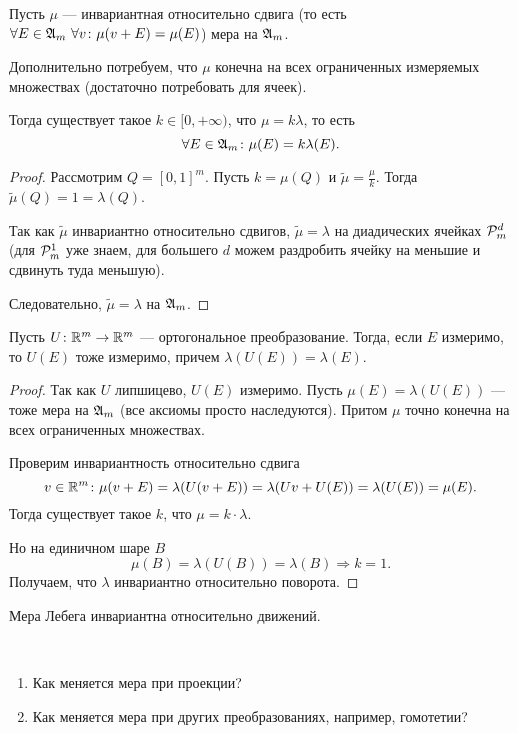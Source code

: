 \begin{thm}
	Пусть $ \mu$ --- инвариантная относительно сдвига (то есть $ \forall E \in \A_{m} ~ \forall v \colon \mu(v + E) = \mu(E)$) мера на  $ \A_{m}$.

	Дополнительно потребуем, что $ \mu$ конечна на всех ограниченных измеряемых множествах (достаточно потребовать для ячеек).

	Тогда существует такое $ k \in [0, +\infty)$, что $ \mu = k \lambda $, то есть 
	\[
		\forall E \in \A_m \colon \mu(E) = k \lambda (E)
	.\] 
\end{thm}
\begin{proof}
	Рассмотрим $ Q = [0, 1]^{m}$. Пусть $ k = \mu(Q)$ и $ \widetilde{ \mu} = \frac{\mu}{k}$.
	Тогда $ \widetilde{ \mu} (Q) = 1 = \lambda (Q)$. 

	Так как $ \widetilde{ \mu} $ инвариантно относительно сдвигов, $ \widetilde{ \mu}  = \lambda $ на диадических ячейках $ \P_{m}^{d}$ (для $ \P_{m}^{1}$ уже знаем, для большего $ d$ можем раздробить ячейку на меньшие и сдвинуть туда меньшую).

	Следовательно, $ \widetilde{ \mu}  = \lambda $ на $ \A_m$.
\end{proof}

\begin{thm}
	Пусть $ U\colon \R^{m} \to \R^{m} $ --- ортогональное преобразование. 
	Тогда, если $ E$ измеримо, то $ U(E)$ тоже измеримо, причем $ \lambda (U(E)) = \lambda (E)$.
\end{thm}
\begin{proof}
	Так как $ U$ липшицево, $ U(E)$ измеримо. Пусть $ \mu(E) = \lambda (U(E))$ --- тоже мера на $ \Am$ (все аксиомы просто наследуются). Притом $ \mu$ точно конечна на всех ограниченных множествах.

	Проверим инвариантность относительно сдвига
	\[
		v \in \R^{m} \colon \mu(v + E) = \lambda (U(v + E)) = \lambda (Uv + U(E)) = \lambda (U(E)) = \mu(E)
	.\] 
	Тогда существует такое $ k$, что $ \mu = k\cdot \lambda $.

	Но на единичном шаре $ B$ 
	\[
		\mu(B) = \lambda (U(B)) = \lambda (B) \Longrightarrow k = 1
	.\] 
	Получаем, что $ \lambda $ инвариантно относительно поворота.
\end{proof}
\begin{cor}
    Мера Лебега инвариантна относительно движений.
\end{cor}
\begin{prac}
	~\begin{enumerate}[noitemsep]
        \item Как меняется мера при проекции?
		\item Как меняется мера при других преобразованиях, например, гомотетии?
    \end{enumerate} 
\end{prac}

